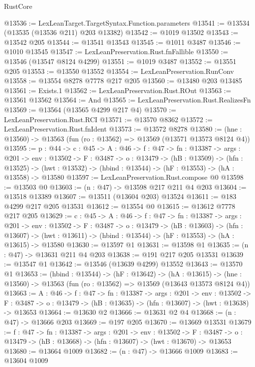 \begin{lexlean}{RustCore}
\begin{coremodule}
@13536 := LexLeanTarget.TargetSyntax.Function.parameters
@13541 := @13534 (@13535 (@13536 @211) @203 @13382)
@13542 := @1019 @13502
@13543 := @13542 @205
@13544 := @13541 @13543
@13545 := @1011 @3487
@13546 := @1010 @13545
@13547 := LexLeanPreservation.Rust.fnFallible
@13550 := @13546 (@13547 @8124 @4299)
@13551 := @1019 @3487
@13552 := @13551 @205
@13553 := @13550 @13552
@13554 := LexLeanPreservation.RunConv
@13558 := @13554 @8278 @7778 @217 @205
@13560 := @13480 @203 @13485
@13561 := Exists.{1}
@13562 := LexLeanPreservation.Rust.ROut
@13563 := @13561 @13562
@13564 := And
@13565 := LexLeanPreservation.Rust.RealizesFn
@13569 := @13564 (@13565 @4299 @217 @4)
@13570 := LexLeanPreservation.Rust.RCI
@13571 := @13570 @8362
@13572 := LexLeanPreservation.Rust.fnIdent
@13573 := @13572 @8278
@13580 := (hne : @13560) -> @13563 (fun (ro : @13562) => @13569 (@13571 @13573 @8124 @4))
@13595 := {p : @44} ->
  {c : @45} ->
  {A : @46} ->
  {f : @47} ->
  {fn : @13387} ->
  {args : @201} ->
  {env : @13502} ->
  {F : @3487} ->
  {o : @13479} ->
  (hB : @13509) ->
  (hfn : @13525) -> (hwt : @13532) -> (hbind : @13544) -> (hF : @13553) -> (hA : @13558) -> @13580
@13597 := LexLeanPreservation.Rust.compose @0
@13598 := @13503 @0
@13603 := (n : @47) -> @13598 @217 @211 @4 @203
@13604 := @13518 @13389
@13607 := @13511 (@13604 @203) @13524
@13611 := @183 @4299 @217 @205 @13531
@13612 := @13554 @0
@13615 := @13612 @7778 @217 @205
@13629 := {c : @45} ->
  {A : @46} ->
  {f : @47} ->
  {fn : @13387} ->
  {args : @201} ->
  {env : @13502} ->
  {F : @3487} ->
  {o : @13479} ->
  (hB : @13603) ->
  (hfn : @13607) -> (hwt : @13611) -> (hbind : @13544) -> (hF : @13553) -> (hA : @13615) -> @13580
@13630 := @13597 @1
@13631 := @13598 @1
@13635 := (n : @47) -> @13631 @211 @4 @203
@13638 := @191 @217 @205 @13531
@13639 := @13547 @1
@13642 := @13546 (@13639 @4299) @13552
@13643 := @13570 @1
@13653 := (hbind : @13544) ->
  (hF : @13642) ->
  (hA : @13615) -> (hne : @13560) -> @13563 (fun (ro : @13562) => @13569 (@13643 @13573 @8124 @4))
@13663 := {A : @46} ->
  {f : @47} ->
  {fn : @13387} ->
  {args : @201} ->
  {env : @13502} ->
  {F : @3487} -> {o : @13479} -> (hB : @13635) -> (hfn : @13607) -> (hwt : @13638) -> @13653
@13664 := @13630 @2
@13666 := @13631 @2 @4
@13668 := (n : @47) -> @13666 @203
@13669 := @197 @205
@13670 := @13669 @13531
@13679 := {f : @47} ->
  {fn : @13387} ->
  {args : @201} ->
  {env : @13502} ->
  {F : @3487} -> {o : @13479} -> (hB : @13668) -> (hfn : @13607) -> (hwt : @13670) -> @13653
@13680 := @13664 @1009
@13682 := (n : @47) -> @13666 @1009
@13683 := @13604 @1009

\end{coremodule}
\end{lexlean}
